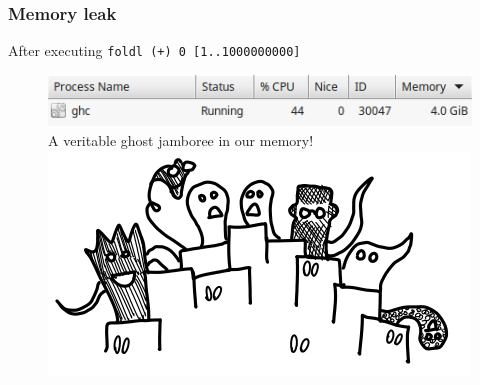 \documentclass{beamer}
\begin{document}

\begin{frame}
\frametitle{Memory leak}
After executing \texttt{foldl (+) 0 [1..1000000000]}\newline
\begin{figure}[hbt!]
    \centering
    \includegraphics[height=0.1\textheight]{./pic/memory-usage-ghc.png}
    \newline\newline
    A veritable ghost jamboree in our memory!
    \includegraphics[height=0.4\textheight]{./pic/ghost-party.png}
\end{figure}
\end{frame}
\end{document}
